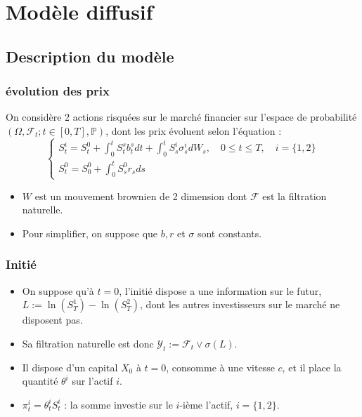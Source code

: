 \documentclass{beamer}
\begin{document}
\section{Modèle diffusif}

\subsection{Description du modèle}

\begin{frame}
\frametitle{évolution des prix}
On considère 2 actions risquées sur le marché financier sur l'espace de probabilité $(\Omega, \mathcal{F}_t; t \in[0, T], \mathbb{P})$, dont les prix évoluent selon l'équation : 
\begin{equation*}
\begin{cases} S^i_t = S^0_t + \int_{0}^{t} S^s_t b^s_t dt + \int_{0}^{t} S^i_s \sigma^i_s dW_s, \quad 0 \leq t \leq T, \quad i = \{1, 2\}\\
S^0_t = S^0_0 +  \int_{0}^{t} S^0_s r_s ds \end{cases}
\end{equation*}
\begin{itemize}
\item $W$ est un mouvement brownien de 2 dimension dont $\mathcal{F}$ est la filtration naturelle.\\
\item Pour simplifier, on suppose que $b, r$ et $\sigma$ sont constants.
\end{itemize}
\end{frame}

\begin{frame}
\frametitle{Initié}
\begin{itemize}
\item On suppose qu'à $t= 0$, l'initié dispose a une information sur le futur, $L := \ln(S^1_T) - \ln(S^2_T)$, dont les autres investisseurs sur le marché ne disposent pas.  \\
\item Sa filtration naturelle est donc $\mathcal{Y}_t := \mathcal{F}_t \vee \sigma(L)$.\\
\item Il dispose d'un capital $X_0$ à $t=0$, consomme à une vitesse $c$, et il place la quantité $\theta^i$ sur l'actif $i$.\\
\item $\pi_t^i = \theta^i_t S^i_t$ : la somme investie sur le $i$-ième l'actif, $i= \{1, 2\}$.
\end{itemize}
\end{frame}
\end{document}
